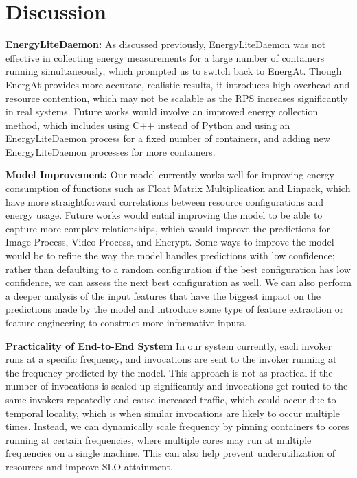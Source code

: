 \documentclass[times, 10pt,twocolumn]{article}
\begin{document}
\section{Discussion}
\textbf{EnergyLiteDaemon:} As discussed previously, EnergyLiteDaemon was not effective in collecting energy measurements for a large number of containers running simultaneously, which prompted us to switch back to EnergAt. Though EnergAt provides more accurate, realistic results, it introduces high overhead and resource contention, which may not be scalable as the RPS increases significantly in real systems. Future works would involve an improved energy collection method, which includes using C++ instead of Python and using an EnergyLiteDaemon process for a fixed number of containers, and adding new EnergyLiteDaemon processes for more containers. 

\textbf{Model Improvement:} Our model currently works well for improving energy consumption of functions such as Float Matrix Multiplication and Linpack, which have more straightforward correlations between resource configurations and energy usage. Future works would entail improving the model to be able to capture more complex relationships, which would improve the predictions for Image Process, Video Process, and Encrypt. Some ways to improve the model would be to refine the way the model handles predictions with low confidence; rather than defaulting to a random configuration if the best configuration has low confidence, we can assess the next best configuration as well. We can also perform a deeper analysis of the input features that have the biggest impact on the predictions made by the model and introduce some type of feature extraction or feature engineering to construct more informative inputs. 

\textbf{Practicality of End-to-End System} In our system currently, each invoker runs at a specific frequency, and invocations are sent to the invoker running at the frequency predicted by the model. This approach is not as practical if the number of invocations is scaled up significantly and invocations get routed to the same invokers repeatedly and cause increased traffic, which could occur due to temporal locality, which is when similar invocations are likely to occur multiple times. Instead, we can dynamically scale frequency by pinning containers to cores running at certain frequencies, where multiple cores may run at multiple frequencies on a single machine. This can also help prevent underutilization of resources and improve SLO attainment.
\end{document}
